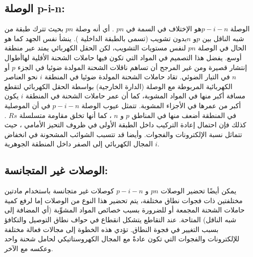 \begin{itemize}
	\subsection{الوصلة p-i-n:}
	الوصلة $ p-i-n $هو الإختلاف في السمة في $ pn $ . أي أنه وصلة $ pn $ بحيث تترك طبقة من شبه الناقل بين $ p $و $ n $بدون تشويب (تسمى بالطبقة الداخلية ). ينشأ نفس الجهد كما هو الحال في الوصلة $ pn $ لنفس مستويات التشويب، لكن الحقل الكهربائي يمتد عبر منطقة أوسع. يفضل هذا التصميم في المواد التي تكون فيها حاملات الشحنة الأقلية لهاأطوال إنتشار قصيرة ومن غير المرجح أن تساهم ناقلات الشحنة المولدة ضوئيا في الجزء $ p $ أو $ n $ في التيار الضوئي. تقاد حاملات الشحنة المولدة ضوئيا في المنطقة $ i $ نحو العناصر الكهربائية المربوطة مع الوصلة (الدارة الخارجية) بواسطة الحقل الكهربائي لتقطع مسافة أكبر منها في المواد المشوبة، كما أن عمر حاملات الشحنة في المنطقة $ i $ يكون أكبر من عمرها في الأجزاء المشوبة. تتمثل عيوب الوصلة $ p-i-n $ في أن الموصلية في المنطقة أضعف منها في المناطق $ p $ و $ n $ ، كما أنها تخلق مقاومة متسلسلة $ Rs $ . كذلك فإن احتمال إعادة التركيب داخل الطبقة الأولى في ظروف التحيز الأمامي ، حيث تتماثل نسبة الإلكترونات والفجوات. وأيضا قد تتسبب الشوائب المشحونة في انخفاض المجال الكهربائي إلى الصفر داخل المنطقة الجوهرية $ i $.
	\subsection{الوصلات غير المتجانسة: }
	يمكن أيضًا تحضير الوصلات $ p n $ و $ p-i-n $ كوصلات غير متجانسة باستخدام مادتين مختلفتين ذات فجوات نطاق مختلفة، يتم تحضير هذا النوع من الوصلات إما لرفع كمية حاملات الشحنة المجمعة أو للضرورة بسبب خصائص المواد المشوِّبة (أي المضافة إلى شبه الناقل) المتاحة. عند التقاطع يتشكل انقطاع في حواف نطاق التوصيل والتكافؤ بسبب التغيير في فجوة النطاق. تؤدي هذه الخطوة إلى مجالات فعالة مختلفة للإلكترونات والفجوات التي تكون عادةً مع المجال الكهروستاتيكي لحامل شحنة واحد وعكسه مع الآخر.

\end{itemize}
